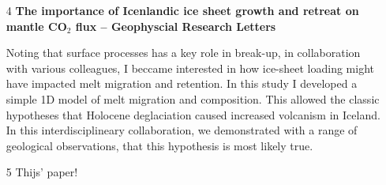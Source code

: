 \begin{itemize}
\item[4] {\bf The importance of Icenlandic ice sheet growth and retreat on mantle CO$_2$ flux -- Geophyscial Research Letters}

Noting that surface processes has a key role in break-up, in collaboration with various colleagues, I beccame interested in how ice-sheet loading might have impacted melt migration and retention. In this study I developed a simple 1D model of melt migration and composition. This allowed the classic hypotheses that Holocene deglaciation caused increased volcanism in Iceland. In this interdisciplineary collaboration, we demonstrated with a range of geological observations, that this hypothesis is most likely true.

\item[5] {Thijs' paper!} 

\end{itemize}
